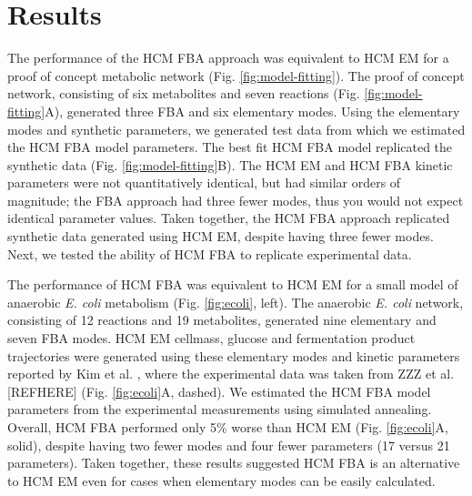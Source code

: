 \documentclass[10pt,twocolumn,twoside,final]{IEEEtran}
\begin{document}
\section{Results}
The performance of the HCM FBA approach was equivalent to HCM EM for a proof of concept metabolic network (Fig. \ref{fig:model-fitting}).
The proof of concept network, consisting of six metabolites and seven reactions (Fig. \ref{fig:model-fitting}A), generated three FBA and six elementary modes.
Using the elementary modes and synthetic parameters, we generated test data from which we estimated the HCM FBA model parameters.
The best fit HCM FBA model replicated the synthetic data (Fig. \ref {fig:model-fitting}B).
The HCM EM and HCM FBA kinetic parameters were not quantitatively identical, but had similar orders of magnitude;
the FBA approach had three fewer modes, thus you would not expect identical parameter values.
Taken together, the HCM FBA approach replicated synthetic data generated using HCM EM, despite having three fewer modes.
Next, we tested the ability of HCM FBA to replicate experimental data.


The performance of HCM FBA was equivalent to HCM EM for a small model of anaerobic \textit{E. coli} metabolism (Fig. \ref{fig:ecoli}, left).
The anaerobic \textit{E. coli} network, consisting of 12 reactions and 19 metabolites, generated nine elementary and seven FBA modes.
HCM EM cellmass, glucose and fermentation product trajectories were generated
using these elementary modes and kinetic parameters reported by Kim et al. \cite{2008_kim_varner_ramkrishna_BiotechProg},
where the experimental data was taken from ZZZ et al. [REFHERE] (Fig. \ref{fig:ecoli}A, dashed).
We estimated the HCM FBA model parameters from the experimental measurements using simulated annealing.
Overall, HCM FBA performed only 5\% worse than HCM EM (Fig. \ref {fig:ecoli}A, solid), despite having two fewer modes and four fewer parameters (17 versus 21 parameters).
Taken together, these results suggested HCM FBA is an alternative to HCM EM even for cases when elementary modes can be easily calculated.
\end{document}
